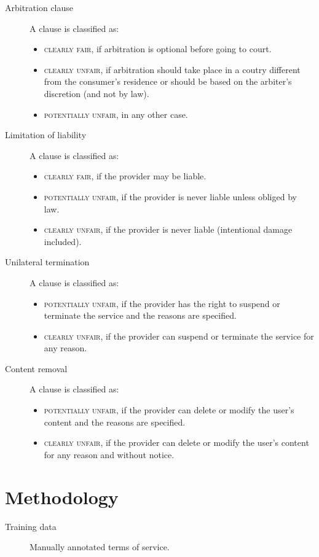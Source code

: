 \begin{description}
    \item[Arbitration clause] 
        A clause is classified as:
        \begin{itemize}
            \item \textsc{clearly fair}, if arbitration is optional before going to court.
            \item \textsc{clearly unfair}, if arbitration should take place in a coutry different from the consumer's residence or should be based on the arbiter's discretion (and not by law).
            \item \textsc{potentially unfair}, in any other case.
        \end{itemize}

    \item[Limitation of liability] 
        A clause is classified as:
        \begin{itemize}
            \item \textsc{clearly fair}, if the provider may be liable.
            \item \textsc{potentially unfair}, if the provider is never liable unless obliged by law.
            \item \textsc{clearly unfair}, if the provider is never liable (intentional damage included).
        \end{itemize}
    
    \item[Unilateral termination] 
        A clause is classified as:
        \begin{itemize}
            \item \textsc{potentially unfair}, if the provider has the right to suspend or terminate the service and the reasons are specified.
            \item \textsc{clearly unfair}, if the provider can suspend or terminate the service for any reason.
        \end{itemize}

    \item[Content removal] 
        A clause is classified as:
        \begin{itemize}
            \item \textsc{potentially unfair}, if the provider can delete or modify the user's content and the reasons are specified.
            \item \textsc{clearly unfair}, if the provider can delete or modify the user's content for any reason and without notice.
        \end{itemize}
\end{description}



\section{Methodology}

\begin{description}
    \item[Training data]
        Manually annotated terms of service.
\end{description}